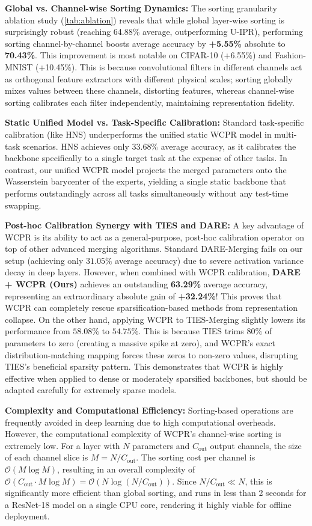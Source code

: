 \documentclass{article}
\theoremstyle{plain}
\theoremstyle{definition}
\theoremstyle{remark}
\begin{document}
\textbf{Global vs. Channel-wise Sorting Dynamics:} The sorting granularity ablation study (\cref{tab:ablation}) reveals that while global layer-wise sorting is surprisingly robust (reaching 64.88\% average, outperforming U-IPR), performing sorting channel-by-channel boosts average accuracy by \textbf{+5.55\%} absolute to \textbf{70.43\%}. This improvement is most notable on CIFAR-10 (+6.55\%) and Fashion-MNIST (+10.45\%). This is because convolutional filters in different channels act as orthogonal feature extractors with different physical scales; sorting globally mixes values between these channels, distorting features, whereas channel-wise sorting calibrates each filter independently, maintaining representation fidelity.

\textbf{Static Unified Model vs. Task-Specific Calibration:} Standard task-specific calibration (like HNS) underperforms the unified static WCPR model in multi-task scenarios. HNS achieves only 33.68\% average accuracy, as it calibrates the backbone specifically to a single target task at the expense of other tasks. In contrast, our unified WCPR model projects the merged parameters onto the Wasserstein barycenter of the experts, yielding a single static backbone that performs outstandingly across all tasks simultaneously without any test-time swapping.

\textbf{Post-hoc Calibration Synergy with TIES and DARE:} A key advantage of WCPR is its ability to act as a general-purpose, post-hoc calibration operator on top of other advanced merging algorithms. Standard DARE-Merging fails on our setup (achieving only $31.05\%$ average accuracy) due to severe activation variance decay in deep layers. However, when combined with WCPR calibration, \textbf{DARE + WCPR (Ours)} achieves an outstanding \textbf{63.29\%} average accuracy, representing an extraordinary absolute gain of \textbf{+32.24\%}! This proves that WCPR can completely rescue sparsification-based methods from representation collapse. On the other hand, applying WCPR to TIES-Merging slightly lowers its performance from $58.08\%$ to $54.75\%$. This is because TIES trims $80\%$ of parameters to zero (creating a massive spike at zero), and WCPR's exact distribution-matching mapping forces these zeros to non-zero values, disrupting TIES's beneficial sparsity pattern. This demonstrates that WCPR is highly effective when applied to dense or moderately sparsified backbones, but should be adapted carefully for extremely sparse models.

\textbf{Complexity and Computational Efficiency:} Sorting-based operations are frequently avoided in deep learning due to high computational overheads. However, the computational complexity of WCPR's channel-wise sorting is extremely low. For a layer with $N$ parameters and $C_{\text{out}}$ output channels, the size of each channel slice is $M = N / C_{\text{out}}$. The sorting cost per channel is $\mathcal{O}(M \log M)$, resulting in an overall complexity of $\mathcal{O}(C_{\text{out}} \cdot M \log M) = \mathcal{O}(N \log (N/C_{\text{out}}))$. Since $N/C_{\text{out}} \ll N$, this is significantly more efficient than global sorting, and runs in less than 2 seconds for a ResNet-18 model on a single CPU core, rendering it highly viable for offline deployment.
\end{document}
